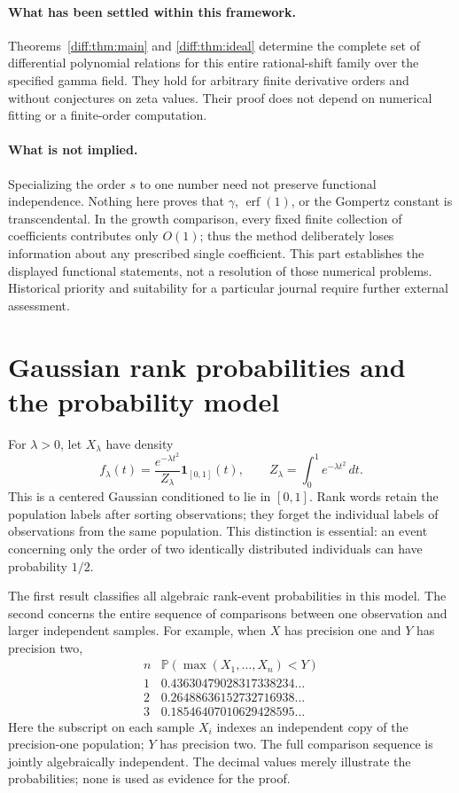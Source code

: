 \documentclass[11pt,a4paper]{article}
\theoremstyle{definition}
\theoremstyle{remark}
\numberwithin{equation}{section}
\begin{document}
\paragraph{What has been settled within this framework.}
Theorems~\ref{diff:thm:main} and \ref{diff:thm:ideal} determine the complete
set of differential polynomial relations for this entire rational-shift
family over the specified gamma field. They hold for arbitrary finite
derivative orders and without conjectures on zeta values. Their proof
does not depend on numerical fitting or a finite-order computation.

\paragraph{What is not implied.}
Specializing the order $s$ to one number need not preserve functional
independence. Nothing here proves that $\gamma$, $\operatorname{erf}(1)$,
or the Gompertz constant is transcendental. In the growth comparison,
every fixed finite collection of coefficients contributes only $O(1)$;
thus the method deliberately loses information about any prescribed
single coefficient. This part establishes the displayed functional
statements, not a resolution of those numerical problems. Historical
priority and suitability for a particular journal require further
external assessment.

\section{Gaussian rank probabilities and the probability model}
For $\lambda>0$, let $X_\lambda$ have density
\[
 f_\lambda(t)=\frac{e^{-\lambda t^2}}{Z_\lambda}
 \mathbf1_{[0,1]}(t),\qquad
 Z_\lambda=\int_0^1e^{-\lambda t^2}\,dt.
\]
This is a centered Gaussian conditioned to lie in $[0,1]$.
Rank words retain the population labels after sorting observations;
they forget the individual labels of observations from the same population.
This distinction is essential: an event concerning only the order of
two identically distributed individuals can have probability $1/2$.

The first result classifies all algebraic rank-event probabilities in
this model. The second concerns the entire sequence of comparisons
between one observation and larger independent samples. For example,
when $X$ has precision one and $Y$ has precision two,
\[
 \begin{array}{c|l}
 n&\mathbb P(\max(X_1,\ldots,X_n)<Y)\\\hline
 1&0.43630479028317338234\ldots\\
 2&0.26488636152732716938\ldots\\
 3&0.18546407010629428595\ldots
 \end{array}
\]
Here the subscript on each sample $X_i$ indexes an independent copy
of the precision-one population; $Y$ has precision two.
The full comparison sequence is jointly algebraically independent.
The decimal values merely illustrate the probabilities; none is used
as evidence for the proof.
\end{document}
